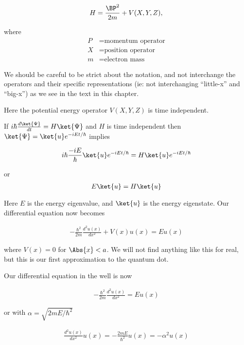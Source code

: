 \begin{align}\label{eqn:PHY356Lecture9:3}
H = \frac{\BP^2}{2m} + V(X,Y,Z),
\end{align}

where
\begin{align*}
P &= \text{momentum operator} \\
X &= \text{position operator} \\
m &= \text{electron mass}
\end{align*}

We should be careful to be strict about the notation, and not interchange the operators and their specific representations (ie: not interchanging ``little-x'' and ``big-x'') as we see in the text in this chapter.

Here the potential energy operator $V(X,Y,Z)$ is time independent.

If $i \hbar \frac{d\ket{\Psi}}{dt} = H \ket{\Psi}$ and $H$ is time independent then $\ket{\Psi} = \ket{u} e^{-i E t/\hbar}$ implies

\begin{align*}
i \hbar \frac{ -i E }{\hbar} \ket{u} e^{-i E t/\hbar} = H \ket{u} e^{-i E t/\hbar}
\end{align*}

or
\begin{align}\label{eqn:PHY356Lecture9:4}
E \ket{u} = H \ket{u}
\end{align}

Here $E$ is the energy eigenvalue, and $\ket{u}$ is the energy eigenstate.  Our differential equation now becomes

\begin{align}\label{eqn:PHY356Lecture9:5}
-\frac{\hbar^2 }{2m} \frac{d^2 u(x)}{dx^2} + V(x) u(x) = E u(x)
\end{align}

where $V(x) = 0$ for $\Abs{x} < a$.  We will not find anything like this for real, but this is our first approximation to the quantum dot.

Our differential equation in the well is now

\begin{align}\label{eqn:PHY356Lecture9:6}
-\frac{\hbar^2 }{2m} \frac{d^2 u(x)}{dx^2} = E u(x)
\end{align}

or with $\alpha = \sqrt{2m E/\hbar^2}$

\begin{align}\label{eqn:PHY356Lecture9:7}
\frac{d^2 u(x)}{dx^2} u(x) = -\frac{2 m E}{\hbar^2} u(x) = - \alpha^2 u(x)
\end{align}

